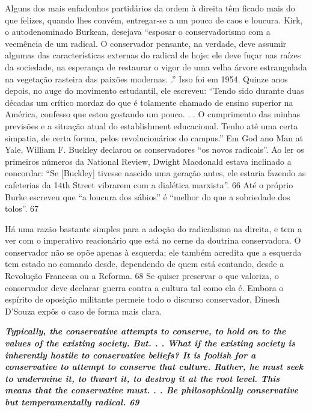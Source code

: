 Alguns dos mais enfadonhos partidários da ordem à direita têm ficado mais do que felizes, quando lhes convém, entregar-se a um pouco de caos e loucura. Kirk, o autodenominado Burkean, desejava “esposar o conservadorismo com a veemência de um radical. O conservador pensante, na verdade, deve assumir algumas das características externas do radical de hoje: ele deve fuçar nas raízes da sociedade, na esperança de restaurar o vigor de uma velha árvore estrangulada na vegetação rasteira das paixões modernas. .” Isso foi em 1954. Quinze anos depois, no auge do movimento estudantil, ele escreveu: “Tendo sido durante duas décadas um crítico mordaz do que é tolamente chamado de ensino superior na América, confesso que estou gostando um pouco. . . O cumprimento das minhas previsões e a situação atual do establishment educacional. Tenho até uma certa simpatia, de certa forma, pelos revolucionários do campus.” Em God ano Man at Yale, William F. Buckley declarou os conservadores “os novos radicais”. Ao ler os primeiros números da National Review, Dwight Macdonald estava inclinado a concordar: “Se [Buckley] tivesse nascido uma geração antes, ele estaria fazendo as cafeterias da 14th Street vibrarem com a dialética marxista”.
 {\color{blue} 66}  
Até o próprio Burke escreveu que “a loucura dos sábios” é “melhor do que a sobriedade dos tolos”.
 {\color{blue} 67}  

 
\par
 
Há uma razão bastante simples para a adoção do radicalismo na direita, e tem a ver com o imperativo reacionário que está no cerne da doutrina conservadora. O conservador não se opõe apenas à esquerda; ele também acredita que a esquerda tem estado no comando desde, dependendo de quem está contando, desde a Revolução Francesa ou a Reforma.
 {\color{blue} 68}  
Se quiser preservar o que valoriza, o conservador deve declarar guerra contra a cultura tal como ela é. Embora o espírito de oposição militante permeie todo o discurso conservador, Dinesh D’Souza expôs o caso de forma mais clara.
 
\par
 

 \textbf{\textit{Typically, the conservative attempts to conserve, to hold on to the values of the existing society. But. . . What if the existing society is inherently hostile to conservative beliefs? It is foolish for a conservative to attempt to conserve that culture. Rather, he must seek to undermine it, to thwart it, to destroy it at the root level. This means that the conservative must. . . Be philosophically conservative but temperamentally radical. {{\color{blue} 69} } } }  
 
